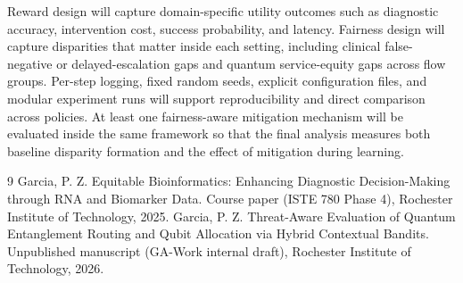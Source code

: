 \documentclass{IEEEtran}
\begin{document}
Reward design will capture domain-specific utility outcomes such as diagnostic accuracy, intervention cost, success probability, and latency. Fairness design will capture disparities that matter inside each setting, including clinical false-negative or delayed-escalation gaps and quantum service-equity gaps across flow groups. Per-step logging, fixed random seeds, explicit configuration files, and modular experiment runs will support reproducibility and direct comparison across policies. At least one fairness-aware mitigation mechanism will be evaluated inside the same framework so that the final analysis measures both baseline disparity formation and the effect of mitigation during learning.

\begin{thebibliography}{9}\setlength{\itemsep}{0em}
Garcia, P. Z. Equitable Bioinformatics: Enhancing Diagnostic Decision-Making through {RNA}
and Biomarker Data. Course paper (ISTE 780 Phase 4), Rochester Institute of Technology,
2025.
Garcia, P. Z. Threat-Aware Evaluation of Quantum Entanglement Routing and Qubit Allocation
via Hybrid Contextual Bandits. Unpublished manuscript (GA-Work internal draft), Rochester
Institute of Technology, 2026.
\end{thebibliography}
\end{document}
